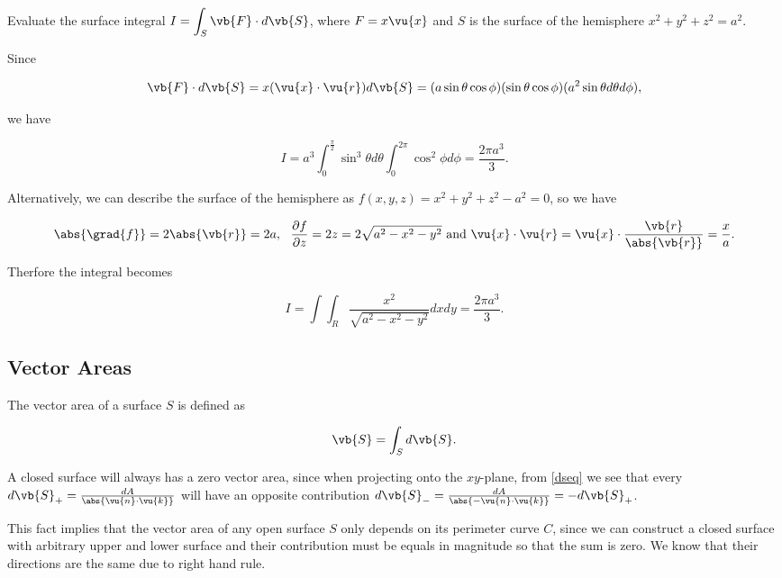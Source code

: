 \documentclass[english,a4paper,12pt]{report}
\begin{document}
{Evaluate the surface integral \(\displaystyle I = \int_{S}^{} \vb{F} \cdot d\vb{S} \), where \(F = x \vu{x}  \) and \(S\) is the surface of the hemisphere \(x^2 + y^2 + z^2 = a^2\).}
{Since 

\begin{equation}
	\vb{F} \cdot d\vb{S}  = x(\vu{x} \cdot \vu{r} )d\vb{S} = (a \sin \theta \cos \phi )(\sin \theta \cos \phi )(a^2\sin \theta d \theta d\phi ),
\end{equation}

we have 

\begin{equation}
	I = a^3 \int_{0}^{\frac{\pi }{2} } \sin ^3 \theta d \theta \int_{0}^{2\pi } \cos ^2\phi d\phi = \frac{2\pi a^3 }{3}.    
\end{equation}

Alternatively, we can describe the surface of the hemisphere as \(f(x,y,z) = x^2 + y^2 + z^2 - a^2 = 0\), so we have 

\begin{equation}
	\abs{\grad{f} } = 2\abs{\vb{r} } = 2a, ~~ 	\frac{\partial f}{\partial z} = 2z = 2\sqrt{a^2-x^2-y^2} \text { and } \vu{x} \cdot \vu{r} = \vu{x} \cdot \frac{\vb{r} }{\abs{\vb{r} } } = \frac{x}{a}. 
\end{equation}

Therfore the integral becomes

\begin{equation}
	I = \int \int_{R}^{} \frac{x^2}{\sqrt{a^2-x^2-y^2} }dxdy = \frac{2\pi a^3 }{3}.    
\end{equation}
 } 

\subsection{Vector Areas}

The vector area of a surface \(S\) is defined as

\begin{equation}
	\vb{S}  = \int_{S}^{} d\vb{S}. 
\end{equation}

A closed surface will always has a zero vector area, since when projecting onto the \(xy\)-plane, from \cref{dseq} we see that every \(d\vb{S} _{+}  = \frac{dA}{\abs{\vu{n} \cdot \vu{k} } } \) will have an opposite contribution \(d\vb{S} _{-} = \frac{dA}{\abs{- \vu{n} \cdot \vu{k} } } = -d\vb{S} _{+} \). 

This fact implies that the vector area of any open surface \(S\) only depends on its perimeter curve \(C\), since we can construct a closed surface with arbitrary upper and lower surface and their contribution must be equals in magnitude so that the sum is zero. We know that their directions are the same due to right hand rule. 
\end{document}
